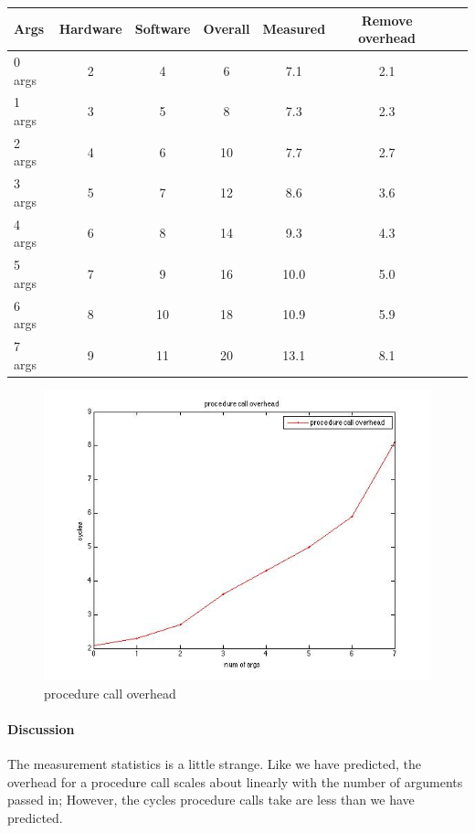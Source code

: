 \begin{center}
\begin{tabular}{l*{6}{c}r}
Args              & Hardware  & Software  & Overall  & Measured  & Remove overhead\\
\hline
0 args & 2 & 4 & 6 & 7.1 & 2.1 \\
1 args & 3 & 5 & 8 & 7.3  & 2.3 \\
2 args & 4 & 6 & 10 & 7.7 & 2.7 \\
3 args & 5 & 7 & 12 & 8.6 & 3.6 \\
4 args & 6 & 8 & 14 & 9.3 & 4.3\\
5 args & 7 & 9 & 16 & 10.0 & 5.0\\
6 args & 8 & 10 & 18 & 10.9 & 5.9\\
7 args & 9 & 11 & 20 & 13.1 & 8.1\\
\end{tabular}
\end{center}

\begin{figure}[htbp] %
   \centering
   \includegraphics[width=5in]{./pics/pcall.jpg} 
   \caption{procedure call overhead}
   \label{fig:procedure call overhead}
\end{figure}

\paragraph{Discussion}
The measurement statistics is a little strange. Like we have predicted, the overhead for a procedure call scales about linearly with the number of arguments passed in; However, the cycles procedure calls take are less than we have predicted. 

